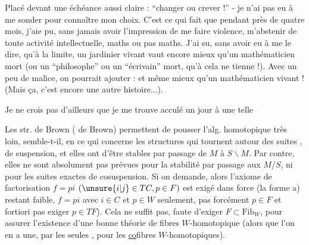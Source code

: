 Placé devant une échéance aussi claire : ``changer ou crever !'' - je n'ai pas eu à me sonder pour connaître mon choix. C'est ce qui fait que pendant près de quatre mois, j'aie pu, sans jamais avoir l'impression de me faire violence, m'abstenir de toute activité intellectuelle, maths ou pas maths. J'ai su, sans avoir eu à me le dire, qu'à la limite, un jardinier vivant vaut encore mieux qu'un mathématicien mort (ou un ``philosophe'' ou un ``écrivain'' mort, qu'à cela ne tienne !). Avec un peu de malice, on pourrait ajouter : et même mieux qu'un mathématicien vivant ! (Mais ça, c'est encore une autre histoire...).

Je ne crois pas d'ailleurs que je me trouve acculé un jour à une telle




Les str. de Brown ( de Brown) permettent de pousser l'alg. homotopique très loin, semble-t-il, en ce qui concerne les structures  qui tournent autour des suites , de suspension, et elles ont   d'être stables par passage de $M$ à $S\backslash M$. Par contre, elles ne sont absolument pas prévues pour la stabilité par passage aux $M/S$, ni pour les suites exactes de cosuspension.  Si on   demande, alors l'axiome de factorisation  $f=pi$ $(\unsure{i|j}\in TC,p\in F)$ est exigé dans   force (la forme a) restant faible, $f=pi$ avec $i\in C$ et $p\in W$ seulement, pas forcément $p\in F$ et   fortiori pas  exiger $p\in TF$). Cela ne suffit pas,  faute d'exiger $F\subset\mathrm{Fib}_W$, pour assurer l'existence d'une bonne théorie de fibres $W$-homotopique (alors que l'on en a une, par les seules , pour les \uline{co}fibres $W$-homotopiques).





